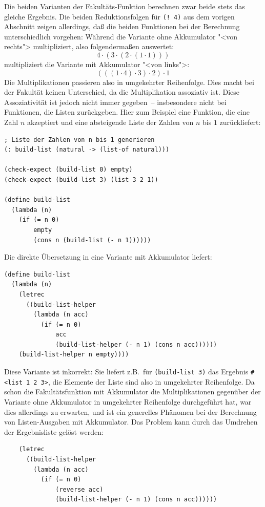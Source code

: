 Die beiden Varianten der Fakultäts-Funktion berechnen zwar beide 
stets das gleiche Ergebnis.  Die beiden Reduktionsfolgen für
\texttt{(! 4)} aus dem vorigen Abschnitt zeigen allerdings, daß die
beiden Funktionen bei der Berechnung unterschiedlich vorgehen:
Während die Variante ohne Akkumulator "<von rechts"> multipliziert,
also folgendermaßen auswertet:
%
\begin{displaymath}
  4\cdot (3 \cdot (2 \cdot (1 \cdot 1)))
\end{displaymath}
%
multipliziert die Variante mit Akkumulator "<von links">:
%
\begin{displaymath}
  (((1 \cdot 4)\cdot 3)\cdot 2)\cdot 1
\end{displaymath}
%
Die Multiplikationen passieren also in umgekehrter Reihenfolge.
Dies macht bei der Fakultät keinen Unterschied, da die Multiplikation
assoziativ ist.  Diese Assoziativität ist jedoch nicht immer
gegeben~-- insbesondere nicht bei Funktionen, die Listen zurückgeben.
Hier zum Beispiel eine Funktion, die eine Zahl $n$ akzeptiert und eine
absteigende Liste der Zahlen von $n$ bis $1$ zurückliefert:
%
\begin{verbatim}
; Liste der Zahlen von n bis 1 generieren
(: build-list (natural -> (list-of natural)))

(check-expect (build-list 0) empty)
(check-expect (build-list 3) (list 3 2 1))

(define build-list
  (lambda (n)
    (if (= n 0)
        empty
        (cons n (build-list (- n 1))))))
\end{verbatim}
%
Die direkte Übersetzung in eine Variante mit Akkumulator liefert:
%
\begin{verbatim}
(define build-list
  (lambda (n)
    (letrec
      ((build-list-helper
        (lambda (n acc)
          (if (= n 0)
              acc
              (build-list-helper (- n 1) (cons n acc))))))
    (build-list-helper n empty))))
\end{verbatim}
%
Diese Variante ist inkorrekt: Sie liefert z.B.\ für
\texttt{(build-list 3)} das Ergebnis \verb|#<list 1 2 3>|, die
Elemente der Liste sind also in umgekehrter Reihenfolge.  Da schon die
Fakultätsfunktion mit Akkumulator die Multiplikationen gegenüber der
Variante ohne Akkumulator in umgekehrter Reihenfolge durchgeführt hat, war dies allerdings zu
erwarten, und ist ein generelles Phänomen bei der Berechnung von
Listen-Ausgaben mit Akkumulator.  Das Problem kann durch das Umdrehen
der Ergebnisliste gelöst werden:
%
\begin{verbatim}
    (letrec
      ((build-list-helper
        (lambda (n acc)
          (if (= n 0)
              (reverse acc)
              (build-list-helper (- n 1) (cons n acc))))))
\end{verbatim}
%


